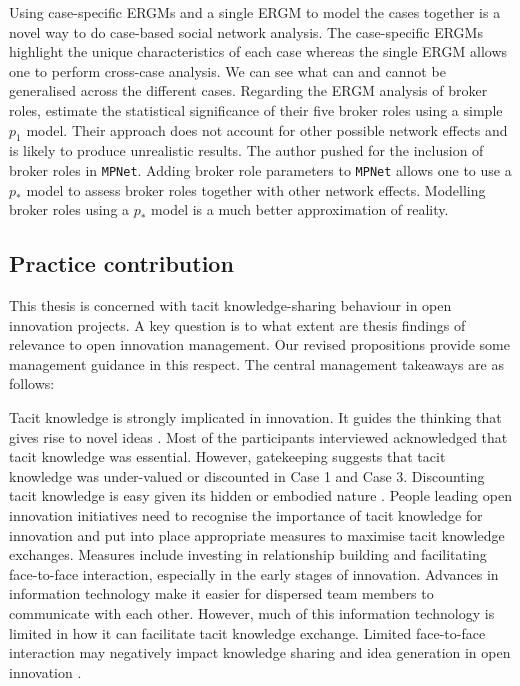 Using case-specific ERGMs and a single ERGM to model the cases together is a novel way to do case-based social network analysis. The case-specific ERGMs highlight the unique characteristics of each case whereas the single ERGM allows one to perform cross-case analysis. We can see what can and cannot be generalised across the different cases. Regarding the ERGM analysis of broker roles, \citet{gould1989structures} estimate the statistical significance of their five broker roles using a simple $p_1$ model. Their approach does not account for other possible network effects and is likely to produce unrealistic results. The author pushed for the inclusion of broker roles in \texttt{MPNet}. Adding broker role parameters to \texttt{MPNet} allows one to use a $p_*$ model to assess broker roles together with other network effects. Modelling broker roles using a $p_*$ model is a much better approximation of reality.

\subsection{Practice contribution}

This thesis is concerned with tacit knowledge-sharing behaviour in open innovation projects. A key question is to what extent are thesis findings of relevance to open innovation management. Our revised propositions provide some management guidance in this respect. The central management takeaways are as follows: \medskip

Tacit knowledge is strongly implicated in innovation. It guides the thinking that gives rise to novel ideas \citep{leonard1998role,lam2000tacit,senker2008contribution}. Most of the participants interviewed acknowledged that tacit knowledge was essential. However, gatekeeping suggests that tacit knowledge was under-valued or discounted in Case 1 and Case 3. Discounting tacit knowledge is easy given its hidden or embodied nature \citep{horvath2000working}. People leading open innovation initiatives need to recognise the importance of tacit knowledge for innovation and put into place appropriate measures to maximise tacit knowledge exchanges. Measures include investing in relationship building and facilitating face-to-face interaction, especially in the early stages of innovation. Advances in information technology make it easier for dispersed team members to communicate with each other. However, much of this information technology is limited in how it can facilitate tacit knowledge exchange. Limited face-to-face interaction may negatively impact knowledge sharing and idea generation in open innovation \citep{johannessen2001mismanagement}. \medskip

